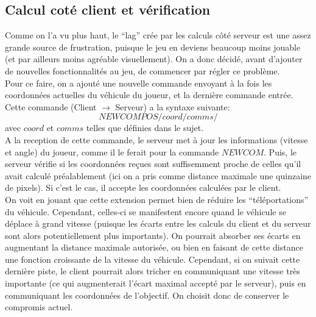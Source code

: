 \documentclass{article}
\begin{document}
\subsection{Calcul coté client et vérification}
Comme on l'a vu plus haut, le ``lag'' crée par les calculs côté serveur est une assez grande source de frustration, puisque le jeu en deviens beaucoup moins jouable (et par ailleurs moins agréable visuellement). On a donc décidé, avant d'ajouter de nouvelles fonctionnalités au jeu, de commencer par régler ce problème.\\
Pour ce faire, on a ajouté une nouvelle commande envoyant à la fois les coordonnées actuelles du véhicule du joueur, et la dernière commande entrée. Cette commande (Client $\rightarrow$ Serveur) a la syntaxe suivante:
$$NEWCOMPOS/coord/comms/$$
avec $coord$ et $comms$ telles que définies dans le sujet.\\
A la reception de cette commande, le serveur met à jour les informations (vitesse et angle) du joueur, comme il le ferait pour la commande $NEWCOM$. Puis, le serveur vérifie si les coordonnées reçues sont suffisemment proche de celles qu'il avait calculé préalablement (ici on a pris comme distance maximale une quinzaine de pixels). Si c'est le cas, il accepte les coordonnées calculées par le client.\\
On voit en jouant que cette extension permet bien de réduire les ``téléportations'' du véhicule. Cependant, celles-ci se manifestent encore quand le véhicule se déplace à grand vitesse (puisque les écarts entre les calculs du client et du serveur sont alors potentiellement plus importants). On pourrait absorber ses écarts en augmentant la distance maximale autorisée, ou bien en faisant de cette distance une fonction croissante de la vitesse du véhicule. Cependant, si on suivait cette dernière piste, le client pourrait alors tricher en communiquant une vitesse très importante (ce qui augmenterait l'écart maximal accepté par le serveur), puis en communiquant les coordonnées de l'objectif. On choisit donc de conserver le compromis actuel.
\end{document}
